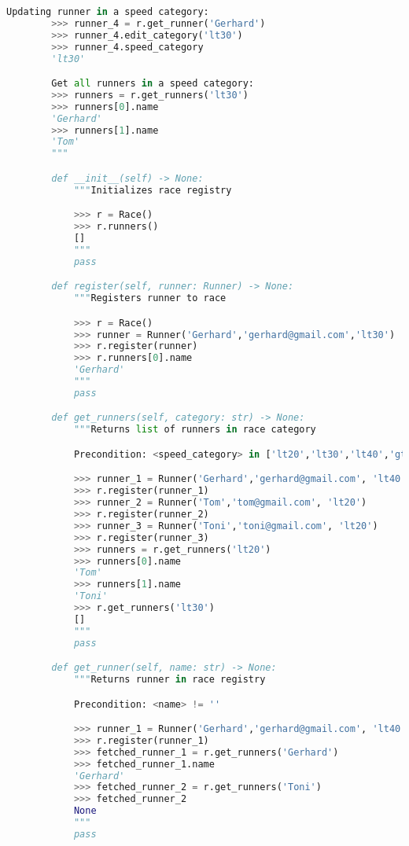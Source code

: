 \documentclass[12pt]{article}
\begin{document}
\begin{enumerate}[1.]
\begin{lstlisting}[language=Python]
        Updating runner in a speed category:
        >>> runner_4 = r.get_runner('Gerhard')
        >>> runner_4.edit_category('lt30')
        >>> runner_4.speed_category
        'lt30'

        Get all runners in a speed category:
        >>> runners = r.get_runners('lt30')
        >>> runners[0].name
        'Gerhard'
        >>> runners[1].name
        'Tom'
        """

        def __init__(self) -> None:
            """Initializes race registry

            >>> r = Race()
            >>> r.runners()
            []
            """
            pass

        def register(self, runner: Runner) -> None:
            """Registers runner to race

            >>> r = Race()
            >>> runner = Runner('Gerhard','gerhard@gmail.com','lt30')
            >>> r.register(runner)
            >>> r.runners[0].name
            'Gerhard'
            """
            pass

        def get_runners(self, category: str) -> None:
            """Returns list of runners in race category

            Precondition: <speed_category> in ['lt20','lt30','lt40','gt40','']

            >>> runner_1 = Runner('Gerhard','gerhard@gmail.com', 'lt40')
            >>> r.register(runner_1)
            >>> runner_2 = Runner('Tom','tom@gmail.com', 'lt20')
            >>> r.register(runner_2)
            >>> runner_3 = Runner('Toni','toni@gmail.com', 'lt20')
            >>> r.register(runner_3)
            >>> runners = r.get_runners('lt20')
            >>> runners[0].name
            'Tom'
            >>> runners[1].name
            'Toni'
            >>> r.get_runners('lt30')
            []
            """
            pass

        def get_runner(self, name: str) -> None:
            """Returns runner in race registry

            Precondition: <name> != ''

            >>> runner_1 = Runner('Gerhard','gerhard@gmail.com', 'lt40')
            >>> r.register(runner_1)
            >>> fetched_runner_1 = r.get_runners('Gerhard')
            >>> fetched_runner_1.name
            'Gerhard'
            >>> fetched_runner_2 = r.get_runners('Toni')
            >>> fetched_runner_2
            None
            """
            pass



\end{lstlisting}
\end{enumerate}
\end{document}
